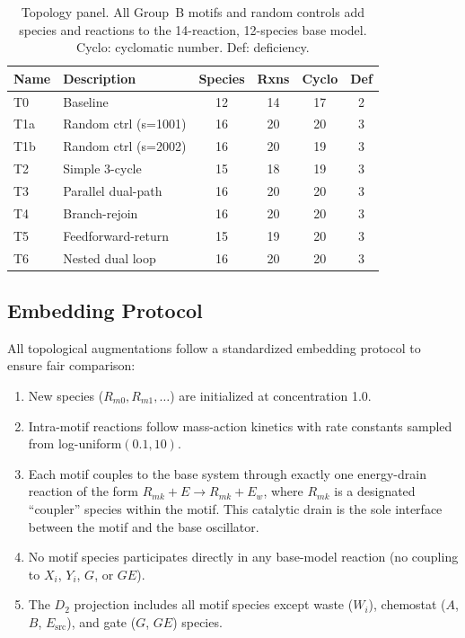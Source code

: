 \documentclass[twocolumn,showpacs,preprintnumbers,amsmath,amssymb,prd,floatfix]{revtex4-2}
\newcommand{\Dtwo}{D_2}
\begin{document}
\begin{table}[b]
\centering
\caption{Topology panel. All Group~B motifs and random controls add species and reactions to the 14-reaction, 12-species base model. Cyclo: cyclomatic number. Def: deficiency.}
\label{tab:topology_panel}
\begin{tabular}{llcccc}
\toprule
Name & Description & Species & Rxns & Cyclo & Def \\
\midrule
T0 & Baseline & 12 & 14 & 17 & 2 \\
T1a & Random ctrl (s=1001) & 16 & 20 & 20 & 3 \\
T1b & Random ctrl (s=2002) & 16 & 20 & 19 & 3 \\
T2 & Simple 3-cycle & 15 & 18 & 19 & 3 \\
T3 & Parallel dual-path & 16 & 20 & 20 & 3 \\
T4 & Branch-rejoin & 16 & 20 & 20 & 3 \\
T5 & Feedforward-return & 15 & 19 & 20 & 3 \\
T6 & Nested dual loop & 16 & 20 & 20 & 3 \\
\bottomrule
\end{tabular}
\end{table}

\subsection{Embedding Protocol}
\label{sec:embedding}

All topological augmentations follow a standardized embedding protocol to ensure fair comparison:

\begin{enumerate}
\item New species ($R_{m0}, R_{m1}, \ldots$) are initialized at concentration 1.0.
\item Intra-motif reactions follow mass-action kinetics with rate constants sampled from log-uniform$(0.1, 10)$.
\item Each motif couples to the base system through exactly one energy-drain reaction of the form $R_{mk} + E \to R_{mk} + E_w$, where $R_{mk}$ is a designated ``coupler'' species within the motif. This catalytic drain is the sole interface between the motif and the base oscillator.
\item No motif species participates directly in any base-model reaction (no coupling to $X_i$, $Y_i$, $G$, or $GE$).
\item The $\Dtwo$ projection includes all motif species except waste ($W_i$), chemostat ($A$, $B$, $E_\text{src}$), and gate ($G$, $GE$) species.
\end{enumerate}
\end{document}
